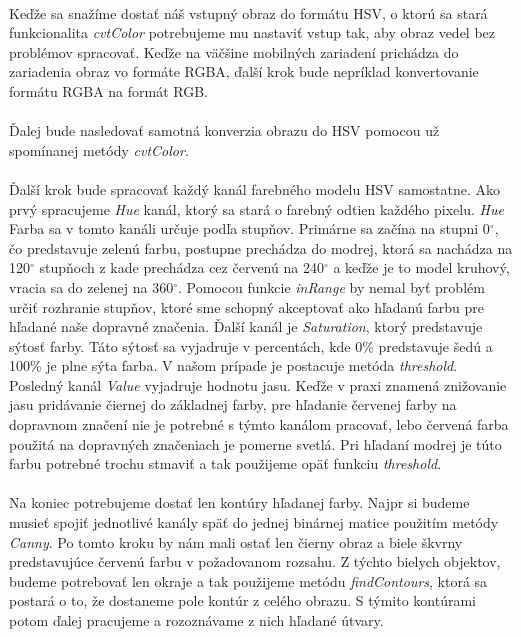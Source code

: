 \documentclass[12pt]{article}
\begin{document}
\paragraph{}
Keďže sa snažíme dostať náš vstupný obraz do formátu HSV, o ktorú sa stará funkcionalita \emph{cvtColor} 
potrebujeme mu nastaviť vstup tak, aby obraz vedel bez problémov spracovať. 
Keďže na väčšine mobilných zariadení prichádza do zariadenia obraz vo formáte RGBA, ďalší krok bude nepríklad konvertovanie formátu RGBA na formát RGB.
\paragraph{}
Ďalej bude nasledovať samotná konverzia obrazu do HSV pomocou už spomínanej metódy \emph{cvtColor}.
\paragraph{}
Ďalší krok bude spracovať každý kanál farebného modelu HSV samostatne. Ako prvý spracujeme \emph{Hue} kanál, ktorý sa stará o farebný odtien každého pixelu.
\emph{Hue} Farba sa v tomto kanáli určuje podľa stupňov. 
Primárne sa začína na stupni 0$^\circ$, čo predstavuje zelenú farbu, postupne prechádza do modrej,
ktorá sa nachádza na 120$^\circ$ stupňoch z kade prechádza cez červenú na 240$^\circ$ a keďže je to model kruhový, vracia sa do zelenej na 360$^\circ$.
Pomocou funkcie \emph{inRange} by nemal byť problém určiť rozhranie stupňov, ktoré sme schopný akceptovať ako hľadanú farbu pre hľadané naše dopravné značenia.
Ďalší kanál je \emph{Saturation}, ktorý predstavuje sýtosť farby. Táto sýtosť sa vyjadruje v percentách, kde 0\% predstavuje šedú a 100\% je plne sýta farba.\cite{hsl_hsv} 
V našom prípade je postacuje metóda \emph{threshold}. Posledný kanál \emph{Value} vyjadruje hodnotu jasu.
Keďže v praxi znamená znižovanie jasu pridávanie čiernej do základnej farby,
pre hľadanie červenej farby na dopravnom značení nie je potrebné s týmto kanálom pracovať, lebo červená farba použitá na dopravných značeniach je pomerne svetlá.
Pri hľadaní modrej je túto farbu potrebné trochu stmaviť a tak použijeme opäť funkciu \emph{threshold}.
\paragraph{}
Na koniec potrebujeme dostať len kontúry hľadanej farby. 
Najpr si budeme musieť spojiť jednotlivé kanály späť do jednej binárnej matice použitím metódy \emph{Canny}. 
Po tomto kroku by nám mali ostať len čierny obraz a biele škvrny predstavujúce červenú farbu v požadovanom rozsahu.
Z týchto bielych objektov, budeme potrebovať len okraje a tak použijeme metódu \emph{findContours}, ktorá sa postará o to, že dostaneme pole kontúr z celého obrazu.
S týmito kontúrami potom ďalej pracujeme a rozoznávame z nich hľadané útvary.
\end{document}
